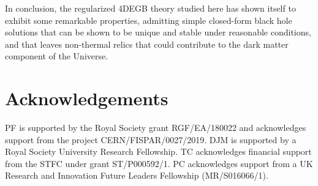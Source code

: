 \documentclass[reprint,amsmath,amssymbGaps,onecolumn,notitlepage,nofootinbib]{revtex4-1}
\begin{document}
\par In conclusion, the regularized 4DEGB theory studied here has shown itself to exhibit some remarkable properties, admitting simple closed-form black hole solutions that can be shown to be unique and stable under reasonable conditions, and that leaves non-thermal relics that could contribute to the dark matter component of the Universe.

\section*{Acknowledgements}

PF is supported by the Royal Society grant RGF/EA/180022 and acknowledges support from the project CERN/FISPAR/0027/2019. DJM is supported by a Royal Society University Research Fellowship. TC acknowledges financial support from the STFC under grant ST/P000592/1. PC acknowledges support from a UK Research and Innovation Future Leaders Fellowship (MR/S016066/1).


\end{document}
